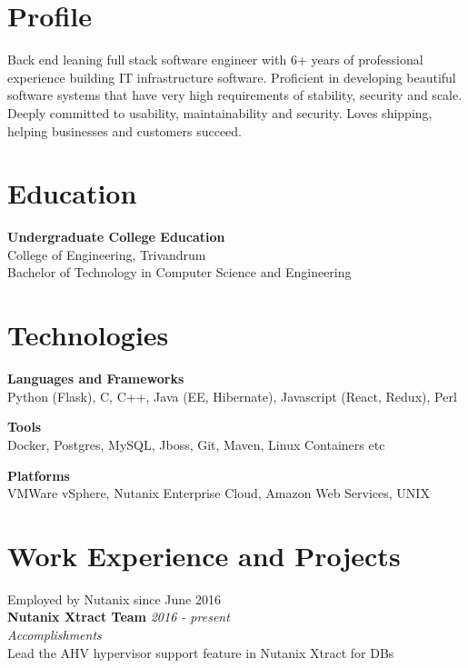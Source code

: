\documentclass[line,margin]{res}
\begin{document}


\address{joji\_antony@gmx.com}
\address{+91 96323 41954}

\begin{resume}

\section{Profile}
Back end leaning full stack software engineer with 6+ years of professional experience building IT infrastructure software. Proficient in developing beautiful software systems that have very high requirements of stability, security and scale. Deeply committed to usability, maintainability and security. Loves shipping, helping businesses and customers succeed.

\section{Education}
{\bf Undergraduate College Education}\\
College of Engineering, Trivandrum\\
Bachelor of Technology in Computer Science and Engineering\\

\section{Technologies}

{\bf Languages and Frameworks}\\
Python (Flask), C, C++, Java (EE, Hibernate), Javascript (React, Redux), Perl

{\bf Tools}\\
Docker, Postgres, MySQL, Jboss, Git, Maven, Linux Containers etc

{\bf Platforms}\\
VMWare vSphere, Nutanix Enterprise Cloud, Amazon Web Services, UNIX

\section{Work Experience and Projects}

Employed by Nutanix since June 2016\\

{\bf Nutanix Xtract Team} \hfill {\it{2016 - present}}\\

{\it{Accomplishments}}\\
Lead the AHV hypervisor support feature in Nutanix Xtract for DBs\\


\end{resume}
\end{document}
